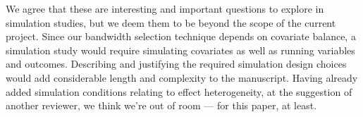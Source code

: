 \documentclass[12pt]{article}
\begin{document}
We agree that these are interesting and important questions to explore
in simulation studies, but we deem them to be beyond the scope of the
current project. Since our bandwidth selection technique depends on
covariate balance, a simulation study would require simulating
covariates as well as running variables and outcomes. Describing and
justifying the required simulation design choices would
add considerable length and complexity to the manuscript.  Having already added simulation conditions relating to effect
heterogeneity, at the suggestion of another reviewer, we think we're
out of room --- for this paper, at least.
\end{document}
